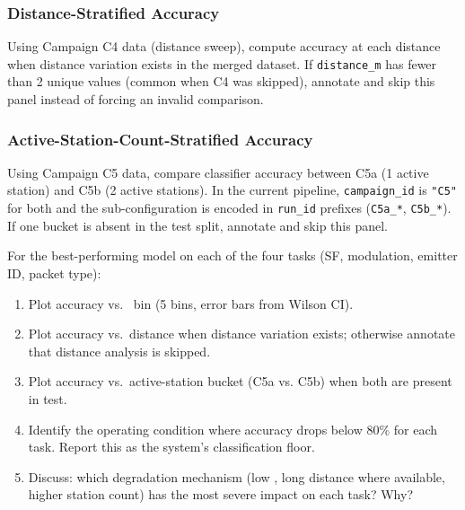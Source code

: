\documentclass[11pt,letterpaper]{article}
\begin{document}
	\subsubsection{Distance-Stratified Accuracy}

	Using Campaign C4 data (distance sweep), compute accuracy at each distance when distance variation exists in the merged dataset. If \texttt{distance\_m} has fewer than 2 unique values (common when C4 was skipped), annotate and skip this panel instead of forcing an invalid comparison.

	\subsubsection{Active-Station-Count-Stratified Accuracy}

	Using Campaign C5 data, compare classifier accuracy between C5a (1 active station) and C5b (2 active stations). In the current pipeline, \texttt{campaign\_id} is \texttt{"C5"} for both and the sub-configuration is encoded in \texttt{run\_id} prefixes (\texttt{C5a\_*}, \texttt{C5b\_*}). If one bucket is absent in the test split, annotate and skip this panel.

	\begin{tcolorbox}[infobox={Exercise: Performance-vs.-Condition Curves}]
		For the best-performing model on each of the four tasks (SF, modulation, emitter ID, packet type):
		\begin{enumerate}
			\item Plot accuracy vs.\ \SNR{} bin (5 bins, error bars from Wilson CI).
			\item Plot accuracy vs.\ distance when distance variation exists; otherwise annotate that distance analysis is skipped.
			\item Plot accuracy vs.\ active-station bucket (C5a vs. C5b) when both are present in test.
			\item Identify the operating condition where accuracy drops below 80\% for each task. Report this as the system's classification floor.
			\item Discuss: which degradation mechanism (low \SNR{}, long distance where available, higher station count) has the most severe impact on each task? Why?
		\end{enumerate}
	\end{tcolorbox}
\end{document}
